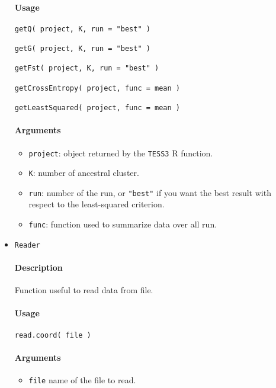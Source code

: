 \documentclass[10pt,a4paper]{article}
\begin{document}
\begin{itemize}
\paragraph{Usage}
\begin{Verbatim}
getQ( project, K, run = "best" )
 
getG( project, K, run = "best" )
  
getFst( project, K, run = "best" )
  
getCrossEntropy( project, func = mean ) 

getLeastSquared( project, func = mean )
\end{Verbatim}
\paragraph{Arguments}
\begin{itemize}
\item \verb|project|: object returned by the \verb|TESS3| R function.
\item \verb|K|: number of ancestral cluster.
\item \verb|run|: number of the run, or \verb|"best"| if you want the best result with respect to the least-squared criterion.
\item \verb|func|: function used to summarize data over all run.

\end{itemize}

\item \verb|Reader|

\paragraph{Description}
Function useful to read data from file.
\paragraph{Usage}
\begin{verbatim}
read.coord( file )
\end{verbatim}
\paragraph{Arguments}
\begin{itemize}
\item \verb|file| name of the file to read.
\end{itemize}


\end{itemize}
\end{document}
